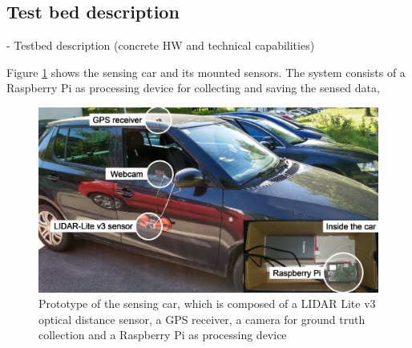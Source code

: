 







\subsection{Test bed description}
\label{sec:test_bed}

- Testbed description (concrete HW and technical capabilities)

Figure \ref{fig:sensing_car} shows the sensing car and its mounted sensors. The system consists of a Raspberry Pi as processing device for collecting and saving the sensed data, 

\begin{figure}
	\centering
	\includegraphics[width=\textwidth]{img/car.jpg}
	\caption{Prototype of the sensing car, which is composed of a LIDAR Lite v3 optical distance sensor, a GPS receiver, a camera for ground truth collection and a Raspberry Pi as processing device}
	\label{fig:sensing_car}
\end{figure}



